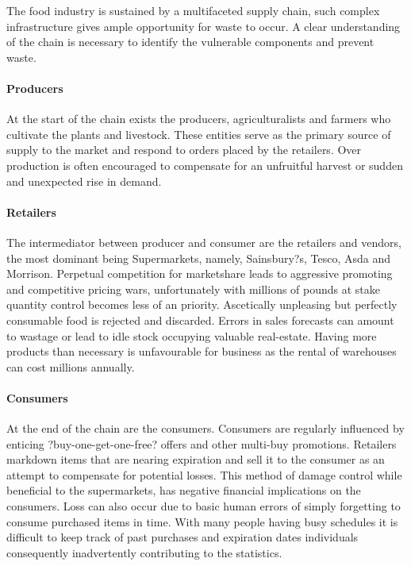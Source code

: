 \documentclass[a4paper, 11pt]{article}
\begin{document}
The food industry is sustained by a multifaceted supply chain, such complex infrastructure gives ample opportunity for waste to occur. A clear understanding of the chain is necessary to identify the vulnerable components and prevent waste.

\paragraph{Producers}At the start of the chain exists the producers, agriculturalists and farmers who cultivate the plants and livestock. These entities serve as the primary source of supply to the market and respond to orders placed by the retailers. Over production is often encouraged to compensate for an unfruitful harvest or sudden and unexpected rise in demand. 

\paragraph{Retailers}The intermediator between producer and consumer are the retailers and vendors, the most dominant being Supermarkets, namely, Sainsbury?s, Tesco, Asda and Morrison. Perpetual competition for marketshare leads to aggressive promoting and competitive pricing wars, unfortunately with millions of pounds at stake quantity control becomes less of an priority. Ascetically unpleasing but perfectly consumable food is rejected and discarded. Errors in sales forecasts can amount to wastage or lead to idle stock occupying valuable real-estate. Having more products than necessary is unfavourable for business as the rental of warehouses can cost millions annually.

\paragraph{Consumers}At the end of the chain are the consumers. Consumers are regularly influenced by enticing ?buy-one-get-one-free? offers and other multi-buy promotions. Retailers markdown items that are nearing expiration and sell it to the consumer as an attempt to compensate for potential losses. This method of damage control while beneficial to the supermarkets, has negative financial implications on the consumers. Loss can also occur due to basic human errors of simply forgetting to consume purchased items in time. With many people having busy schedules it is difficult to keep track of past purchases and expiration dates individuals consequently inadvertently contributing to the statistics. 
\end{document}

